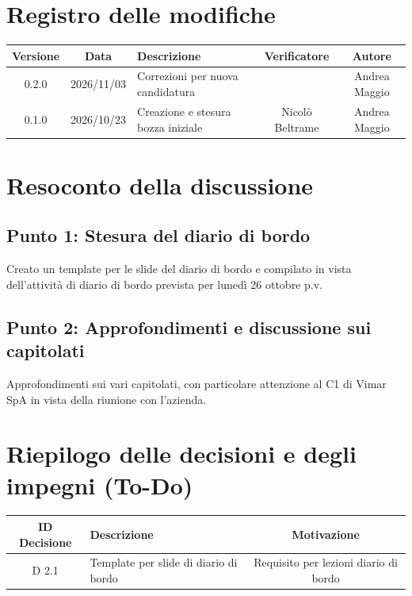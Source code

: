 \documentclass[a4paper, 11pt]{article}
\begin{document}
\section*{Registro delle modifiche}
\begin{tabularx}{\textwidth}{|c|c|X|c|c|}
    \hline
    \textbf{Versione} & \textbf{Data} & \textbf{Descrizione} & \textbf{Verificatore} & \textbf{Autore} \\ \hline
    0.2.0 & 2026/11/03 & Correzioni per nuova candidatura &  & Andrea Maggio \\ \hline
    0.1.0 & 2026/10/23 & Creazione e stesura bozza iniziale & Nicolò Beltrame & Andrea Maggio \\ \hline
\end{tabularx}

\newpage
\tableofcontents
\newpage

\section{Resoconto della discussione}

\subsection{Punto 1: Stesura del diario di bordo}
Creato un template per le slide del diario di bordo e compilato in vista dell'attività di diario di bordo prevista per lunedì 26 ottobre p.v.
\subsection{Punto 2: Approfondimenti e discussione sui capitolati}
Approfondimenti sui vari capitolati, con particolare attenzione al C1 di Vimar SpA in vista della riunione con l'azienda.


\section{Riepilogo delle decisioni e degli impegni (To-Do)}

\begin{tabularx}{\textwidth}{|c|X|c|}
    \hline
    \textbf{ID Decisione} & \textbf{Descrizione} & \textbf{Motivazione} \\ \hline
    D 2.1 & Template per slide di diario di bordo & Requisito per lezioni diario di bordo \\ \hline
\end{tabularx}

\vspace{1cm}
\end{document}
